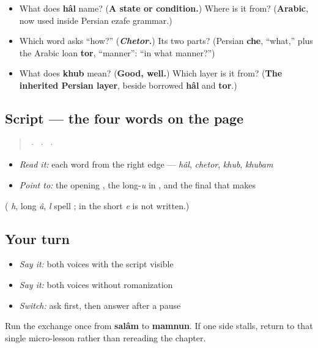 \begin{itemize}
\raggedright
  \item What does \textbf{hâl} name? (\textbf{A state or condition.}) Where is it from? (\textbf{Arabic}, now used inside Persian ezafe grammar.)
  \item Which word asks \textquotedblleft{}how?\textquotedblright{} (\emph{\textbf{Chetor.}}) Its two parts? (Persian \textbf{che}, \textquotedblleft{}what,\textquotedblright{} plus the Arabic loan \textbf{tor}, \textquotedblleft{}manner\textquotedblright{}: \textquotedblleft{}in what manner?\textquotedblright{})
  \item What does \textbf{khub} mean? (\textbf{Good, well.}) Which layer is it from? (\textbf{The inherited Persian layer}, beside borrowed \textbf{hâl} and \textbf{tor}.)
\end{itemize}

\subsection*{Script — the four words on the page}
\begin{quote}
 ·  ·  · 
\end{quote}

\begin{itemize}
\raggedright
  \item \emph{Read it:} each word from the right edge — \emph{hâl}, \emph{chetor}, \emph{khub}, \emph{khubam}
  \item \emph{Point to:} the \textbf{} opening \textbf{}, the long-\emph{u} \textbf{} in \textbf{}, and the final \textbf{} that makes \textbf{}
\end{itemize}

(\textbf{} \emph{h}, \textbf{} long \emph{â}, \textbf{} \emph{l} spell \textbf{}; in \textbf{} the short \emph{e} is not written.)

\subsection*{Your turn}
\begin{itemize}
\raggedright
  \item \emph{Say it:} both voices with the script visible
  \item \emph{Say it:} both voices without romanization
  \item \emph{Switch:} ask first, then answer after a pause
\end{itemize}

\begin{tcolorbox}[breakable,colback=teal!4,colframe=teal!35!black,title={Before you move on}]
Run the exchange once from \textbf{salâm} to \textbf{mamnun}. If one side stalls, return to that single micro-lesson rather than rereading the chapter.
\end{tcolorbox}
